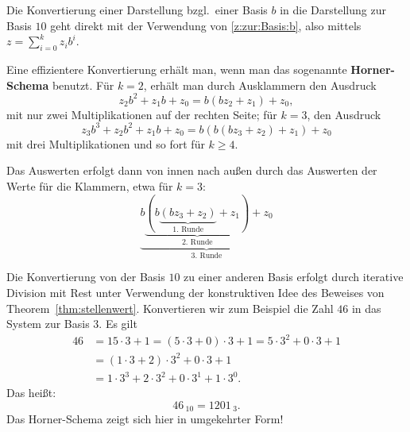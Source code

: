\begin{bem}
	Die Konvertierung einer Darstellung bzgl.~einer Basis $b$ in die Darstellung zur Basis $10$ geht direkt mit der Verwendung von  \eqref{z:zur:Basis:b}, also mittels $z = \sum_{i=0}^k z_i b^i$.
	
	Eine effizientere Konvertierung erhält man, wenn man das sogenannte \textbf{Horner-Schema} benutzt. 
		Für $k=2$, erhält man durch Ausklammern den Ausdruck
	\[
	z_2 b^2 + z_1 b + z_0 = b (b z_2 + z_1) + z_0,
	\]
	 mit nur zwei Multiplikationen auf der rechten Seite;
	für $k=3$, den Ausdruck 
	\[
	z_3 b^3 + z_2 b^2 + z_1 b + z_0 =  b(b (b z_3 + z_2) + z_1 ) + z_0
	\]
	mit drei Multiplikationen und so fort für $k \geq 4$.
	
	Das Auswerten erfolgt dann von innen nach außen durch das Auswerten der Werte für die Klammern, etwa für $k=3$:
	\[
\underbrace{b \underbrace{( b \underbrace{(b z_3 + z_2)}_{\text{1. Runde}} + z_1 )}_{\text{2. Runde}}  + z_0}_{\text{3. Runde}}
	\]
\end{bem}

\begin{bsp}
	Die Konvertierung von der Basis $10$ zu einer anderen Basis erfolgt durch iterative Division mit Rest unter Verwendung der konstruktiven Idee des Beweises von Theorem~\ref{thm:stellenwert}. Konvertieren wir zum Beispiel die Zahl $46$ in das System zur Basis $3$. Es gilt
	\begin{align*}
		46 & = 15 \cdot 3 + 1 = (5 \cdot 3 + 0) \cdot 3 + 1 = 5 \cdot 3^2 + 0 \cdot 3 + 1 
		\\ & = (1 \cdot 3 + 2) \cdot 3^2 + 0 \cdot 3 + 1
		\\ & = 1 \cdot 3^3 + 2 \cdot 3^2 + 0 \cdot 3^1 + 1 \cdot 3^0.
	\end{align*}
	Das heißt:
	\[
	46 \, {}_{10}  = 1201 \, {}_{3}. 
	\]
	Das Horner-Schema zeigt sich hier in umgekehrter Form!
\end{bsp}

